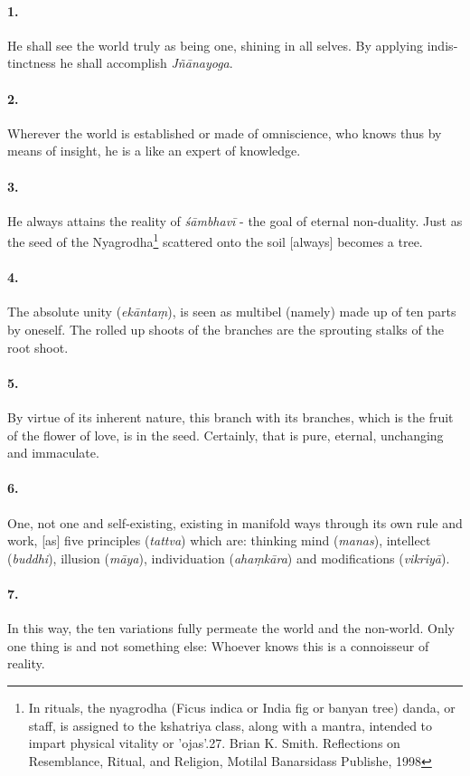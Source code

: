 \begin{otherlanguage}{english}
\begin{tlate}
  \paragraph{1.} He shall see the world truly as being one, shining in all selves. By applying indistinctness he shall accomplish \textit{Jñānayoga}.
  \paragraph{2.} Wherever the world is established or made of omniscience, who knows thus by means of insight, he is a like an expert of knowledge.
  \paragraph{3.} He always attains the reality of \textit{śāmbhavī} - the goal of eternal non-duality. Just as the seed of the Nyagrodha\footnote{In rituals, the nyagrodha (Ficus indica or India fig or banyan tree) danda, or staff, is assigned to the kshatriya class, along with a mantra, intended to impart physical vitality or 'ojas'.27. Brian K. Smith. Reflections on Resemblance, Ritual, and Religion, Motilal Banarsidass Publishe, 1998} scattered onto the soil [always] becomes a tree.
  \paragraph{4.} The absolute unity (\textit{ekāntaṃ}), is seen as multibel (namely) made up of ten parts by oneself. The rolled up shoots of the branches are the sprouting stalks of the root shoot.
  \paragraph{5.} By virtue of its inherent nature, this branch with its branches, which is the fruit of the flower of love, is in the seed. Certainly, that is pure, eternal, unchanging and immaculate. 
  \paragraph{6.} One, not one and self-existing, existing in manifold ways through its own rule and work, [as] five principles (\textit{tattva}) which are: thinking mind (\textit{manas}), intellect (\textit{buddhi}), illusion (\textit{māya}), individuation (\textit{ahaṃkāra}) and modifications (\textit{vikriyā}).
  \paragraph{7.}In this way, the ten variations fully permeate the world and the non-world. Only one thing is and not something else: Whoever knows this is a connoisseur of reality.
  

\end{tlate}
\end{otherlanguage}

